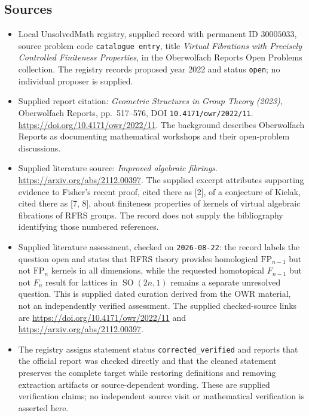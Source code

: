 \documentclass[11pt]{article}
\begin{document}
\subsection{Sources}
\begin{itemize}
\item Local UnsolvedMath registry, supplied record with permanent ID \(30005033\), source problem code \texttt{catalogue entry}, title \emph{Virtual Fibrations with Precisely Controlled Finiteness Properties}, in the Oberwolfach Reports Open Problems collection. The registry records proposed year 2022 and status \texttt{open}; no individual proposer is supplied.
\item Supplied report citation: \emph{Geometric Structures in Group Theory (2023)}, Oberwolfach Reports, pp.~517--576, DOI \texttt{10.4171/owr/2022/11}. \url{https://doi.org/10.4171/owr/2022/11}. The background describes Oberwolfach Reports as documenting mathematical workshops and their open-problem discussions.
\item Supplied literature source: \emph{Improved algebraic fibrings}. \url{https://arxiv.org/abs/2112.00397}. The supplied excerpt attributes supporting evidence to Fisher's recent proof, cited there as [2], of a conjecture of Kielak, cited there as [7, 8], about finiteness properties of kernels of virtual algebraic fibrations of RFRS groups. The record does not supply the bibliography identifying those numbered references.
\item Supplied literature assessment, checked on \texttt{2026-08-22}: the record labels the question open and states that RFRS theory provides homological \(\mathrm{FP}_{n-1}\) but not \(\mathrm{FP}_n\) kernels in all dimensions, while the requested homotopical \(F_{n-1}\) but not \(F_n\) result for lattices in \(\operatorname{SO}(2n,1)\) remains a separate unresolved question. This is supplied dated curation derived from the OWR material, not an independently verified assessment. The supplied checked-source links are \url{https://doi.org/10.4171/owr/2022/11} and \url{https://arxiv.org/abs/2112.00397}.
\item The registry assigns statement status \texttt{corrected\_verified} and reports that the official report was checked directly and that the cleaned statement preserves the complete target while restoring definitions and removing extraction artifacts or source-dependent wording. These are supplied verification claims; no independent source visit or mathematical verification is asserted here.
\end{itemize}
\end{document}
